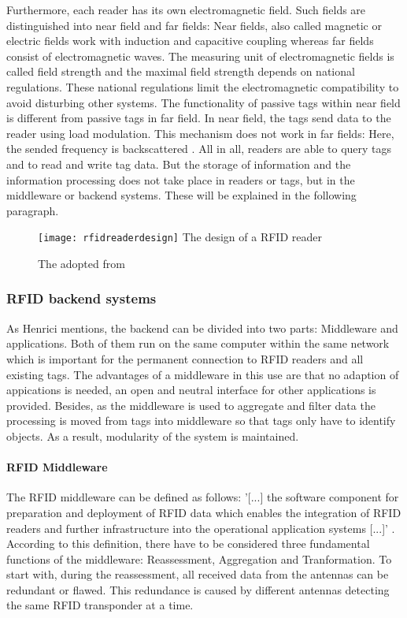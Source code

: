 Furthermore, each reader has its own electromagnetic field. Such fields are distinguished into near field and far fields: Near fields, also called magnetic or electric fields work with induction and capacitive coupling whereas far fields consist of electromagnetic waves. The measuring unit of electromagnetic fields is called field strength and the maximal field strength depends on national regulations. These national regulations limit the electromagnetic compatibility to avoid disturbing other systems. The functionality of passive tags within near field is different from passive tags in far field. In near field, the tags send data to the reader using load modulation. This mechanism does not work in far fields: Here, the sended frequency is backscattered \cite{henrici}.
All in all, readers are able to query tags and to read and write tag data. But the storage of information and the information processing does not take place in readers or tags, but in the middleware or backend systems. These will be explained in the following paragraph.

\begin{figure}
\centering
\texttt{[image: rfidreaderdesign]} The design of a RFID reader 
\caption{\label{fig:readerdesign}The adopted from \cite[p.17]{chipless}} 
\end{figure}

\subsubsection{RFID backend systems} \label{backend}

As Henrici \cite{henrici} mentions, the backend can be divided into two parts: Middleware and applications. Both of them run on the same computer within the same network which is important for the permanent connection to RFID readers and all existing tags. The advantages of a middleware in this use are that no adaption of appications is needed, an open and neutral interface for other applications is provided. Besides, as the middleware is used to aggregate and filter data the processing is moved from tags into middleware so that tags only have to identify objects. As a result, modularity of the system is maintained.

\paragraph{RFID Middleware}

The RFID middleware can be defined as follows: '[...] the software component for preparation and deployment of RFID data which enables the integration of RFID readers and further infrastructure into the operational application systems [...]' \cite[p.20 ff.]{fokus}. According to this definition, there have to be considered three fundamental functions of the middleware: Reassessment, Aggregation and Tranformation. To start with, during the reassessment, all received data from the antennas can be redundant or flawed. This redundance is caused by different antennas detecting the same RFID transponder at a time.

